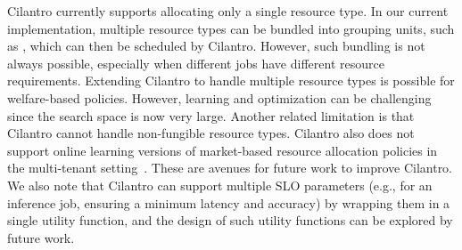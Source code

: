 Cilantro currently supports allocating only a single resource type. In our current implementation,
multiple resource types can be bundled into grouping units, such as , which can then be scheduled
by Cilantro. However, such bundling is not always possible, especially when different jobs have
different resource requirements.
Extending Cilantro to handle multiple resource types is possible for welfare-based
policies.
However, learning and optimization can be challenging since the search space is now very large.
Another related limitation is that Cilantro cannot handle non-fungible resource types.
Cilantro also does not support online learning versions of market-based resource allocation
policies in the multi-tenant setting~\cite{zahedi2018amdahl,lai2005tycoon,varian1973equity}.
These are avenues for future work to improve Cilantro. 
We also note that Cilantro can support multiple SLO parameters (e.g., for an inference job, ensuring a minimum latency and accuracy) by 
wrapping them in a single utility function, and the design of such utility functions can be explored by future work.








